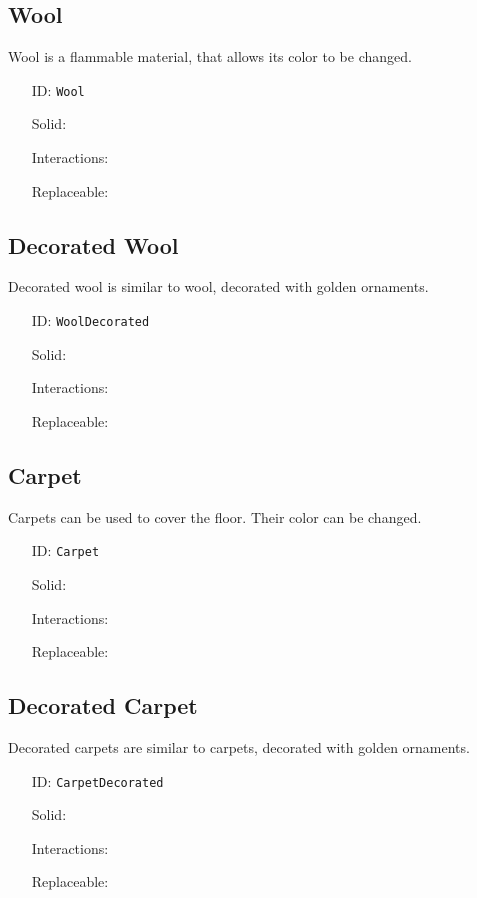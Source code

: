 \subsection{Wool}\label{subsec:blocks_wool}
Wool is a flammable material, that allows its color to be changed.
\newline
\begin{itemize}[nosep]
    \item[ID:] \texttt{Wool}
    \item[Solid:]  \Checkmark \item[Interactions:]  \Checkmark \item[Replaceable:]  \XSolidBrush
\end{itemize}

\subsection{Decorated Wool}\label{subsec:blocks_decorated wool}
Decorated wool is similar to wool, decorated with golden ornaments.
\newline
\begin{itemize}[nosep]
    \item[ID:] \texttt{WoolDecorated}
    \item[Solid:]  \Checkmark \item[Interactions:]  \Checkmark \item[Replaceable:]  \XSolidBrush
\end{itemize}

\subsection{Carpet}\label{subsec:blocks_carpet}
Carpets can be used to cover the floor. Their color can be changed.
\newline
\begin{itemize}[nosep]
    \item[ID:] \texttt{Carpet}
    \item[Solid:]  \Checkmark \item[Interactions:]  \Checkmark \item[Replaceable:]  \XSolidBrush
\end{itemize}

\subsection{Decorated Carpet}\label{subsec:blocks_decorated carpet}
Decorated carpets are similar to carpets, decorated with golden ornaments.
\newline
\begin{itemize}[nosep]
    \item[ID:] \texttt{CarpetDecorated}
    \item[Solid:]  \Checkmark \item[Interactions:]  \Checkmark \item[Replaceable:]  \XSolidBrush
\end{itemize}

